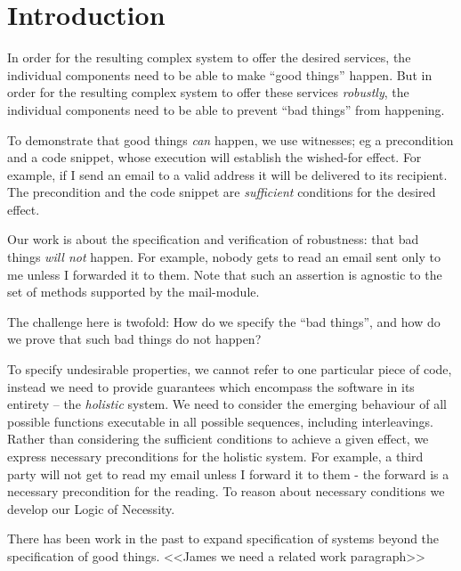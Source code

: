  \newcommand{\prg}[1]{{\texttt{#1}}}
 \section{Introduction}
  
{}
In order for the resulting complex system to offer the
desired services, the individual components 
need to  be able to make ``good things''   happen.
But in order for the resulting  complex system
 to offer these services \emph{robustly},  the individual components 
 need to be able to prevent ``bad things'' from happening. 

To demonstrate that  good things \emph{can} happen, we use witnesses;
eg  a precondition and a code snippet, whose execution will establish the
wished-for effect.  For example, if I send an email to a valid address it will
be delivered to its recipient. The precondition and the code snippet
are \emph{sufficient} conditions for the desired effect. 

Our work is about the specification and verification of robustness: that bad things \emph{will 
not} happen. For example, nobody gets to read an email sent only to me unless I forwarded it to them.   
Note that such an assertion is agnostic to the set of methods supported by the mail-module.

The challenge here is twofold: How do we specify the ``bad things'',
 and how do we prove that such bad things do not happen? 

To specify undesirable properties, we cannot refer to one particular piece of code, instead we need to provide guarantees which encompass the software in its entirety -- the \emph{holistic} system. We need to consider the emerging behaviour of all possible functions executable in all possible sequences, including interleavings. Rather than considering the sufficient conditions to achieve a given effect, we express necessary preconditions for the holistic system. For example, a third party will not get to read my email unless I forward it to them - the forward is a necessary precondition for the reading. To reason about necessary conditions we develop our Logic of Necessity.

There has been work in the past to expand specification of systems beyond the specification of good things. <<James we need a related work paragraph>>


